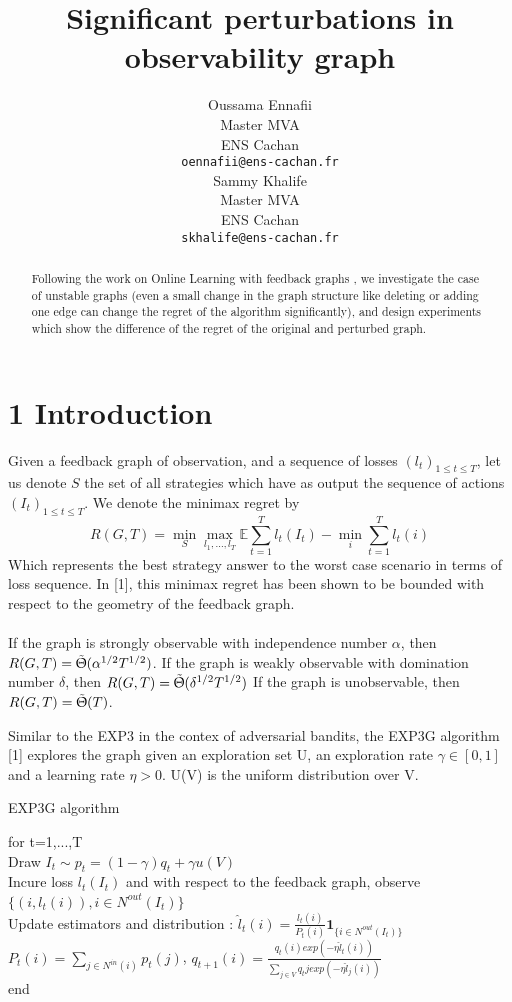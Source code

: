 \documentclass{article} %
\title{Significant perturbations in observability graph}
\author{
Oussama Ennafii\\
Master MVA\\
ENS Cachan\\
\texttt{oennafii@ens-cachan.fr} \\
\And
Sammy Khalife \\
Master MVA\\
ENS Cachan\\
\texttt{skhalife@ens-cachan.fr}
}
\begin{document}
\maketitle

\begin{abstract}
Following the work on Online Learning with feedback graphs \cite{journals/corr/AlonCDK15} ,
we investigate the case of unstable graphs (even a small change in the graph structure like deleting or adding one edge can change the regret of the algorithm significantly), and design experiments which show the difference of the regret of the original and perturbed graph.
\end{abstract}

\section*{1 Introduction}
Given a feedback graph of observation, and a sequence of losses $(l_t)_{1 \leq t \leq T}$, let us denote $S$ the set of all strategies which have as output the sequence of actions $(I_t)_{1 \leq t \leq T}$. We denote the minimax regret by 
$$ R(G,T)=\min_{S} \max_{l_1,...,l_T} \mathbb{E}  \sum_{t=1}^{T} l_t(I_t) -\min_{i} \sum_{t=1}^{T}l_t(i)  $$
Which represents the best strategy answer to the worst case scenario in terms of loss sequence.
In [1], this minimax regret has been shown to be bounded with respect to the geometry of the feedback graph.~\\
~\\
If the graph is strongly observable with independence number $\alpha$, then 
$ R(G,T) = \tilde{\Uptheta}(\alpha^{1/2}T^{1/2})$.
If the graph is weakly observable with domination number $\delta$, then 
$ R(G,T) = \tilde{\Uptheta}(\delta^{1/2}T^{1/2})$
If the graph is unobservable, then 
$ R(G,T) = \tilde{\Uptheta}(T) $.

Similar to the EXP3 in the contex of adversarial bandits, the EXP3G algorithm [1] explores the graph given an exploration set U, an exploration rate $\gamma \in [0,1]$ and a learning rate $\eta > 0$. U(V) is the uniform distribution over V.\\

 \FloatBarrier
 \begin{algorithm}
 	\caption{EXP3G algorithm}\label{RS}
 	for t=1,...,T ~\\
 	Draw $ I_t \sim p_t = (1-\gamma)q_t + \gamma u(V) $ ~\\
 	Incure loss $l_t(I_t)$ and with respect to the feedback graph, observe $\{(i,l_t(i)), i \in N^{out}(I_t)\}$ ~\\
 	Update estimators and distribution :
 	$\hat{l}_{t}(i)=\frac{l_t(i)}{P_{t}(i)} \textbf{1}_{\{ i \in N^{out}(I_t)\}} \qquad$ $P_t(i)=\sum_{j \in N^{in}(i)}p_{t}(j)$, 
 	$q_{t+1}(i)=\frac{q_t(i)exp(-\eta \hat{l}_{t}(i))}{\sum_{j \in V}q_t{j}exp(-\eta \hat{l}_{j}(i))}$~\\
 	end
 \end{algorithm}
 \FloatBarrier
 
\end{document}

